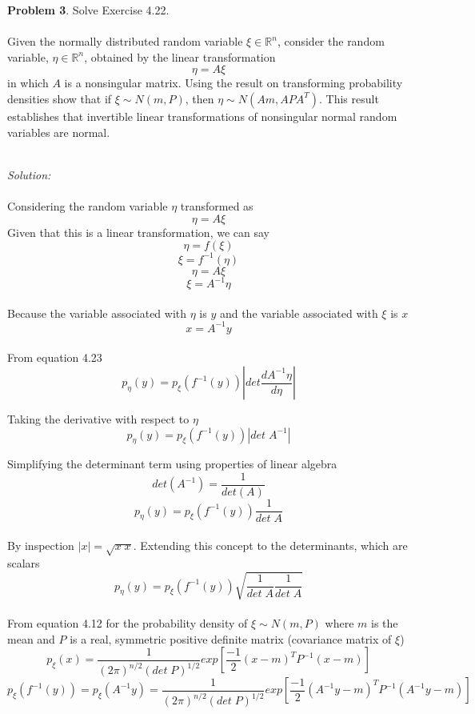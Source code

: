 \documentclass[10pt]{article}
\begin{document}


\newpage

\noindent\colorbox{mygray}{\begin{minipage}{\textwidth}
  {\bf Problem 3}.  Solve Exercise 4.22. \\ \\
  Given the normally distributed random variable $\xi\in{\mathbb R}^n$, consider the random variable, $\eta \in {\mathbb R}^n$, obtained by the linear transformation
\[ \eta = A\xi \]
in which $A$ is a nonsingular matrix. Using the result on transforming probability densities show that if $\xi \sim N(m,P)$, then $\eta \sim N(Am, APA^T)$. This result establishes that invertible linear transformations of nonsingular normal random variables are normal. 
\end{minipage}}
\\

{\em Solution:}  
\\
\\
Considering the random variable $\eta$ transformed as
\[ \eta=A \xi \]
Given that this is a linear transformation, we can say
\[ \eta=f(\xi) \]
\[ \xi=f^{-1}(\eta) \]
\[ \eta=A \xi \]
\[ \xi=A^{-1}\eta \]
\\

\noindent
Because the variable associated with $\eta$ is $y$ and the variable associated with $\xi$ is $x$
\[ x=A^{-1}y \]
\\

\noindent
From equation 4.23
\[ p_\eta(y)=p_\xi(f^{-1}(y))\left|det \frac{dA^{-1}\eta}{d \eta} \right| \]

\noindent
Taking the derivative with respect to $\eta$ 
\[ p_\eta(y)=p_\xi(f^{-1}(y))\left|det \; A^{-1}\right| \]

\noindent
Simplifying the determinant term using properties of linear algebra
\[ det(A^{-1})=\frac{1}{det(A)} \]
\[ p_\eta(y)=p_\xi(f^{-1}(y))\frac{1}{det\; A}\]
\\

\noindent
By inspection $|x|=\sqrt{x\;x}$. Extending this concept to the determinants, which are scalars
\[ p_\eta(y)=p_\xi(f^{-1}(y))\sqrt{\frac{1}{det\; A} \frac{1}{det\; A} } \]
\\

\noindent
From equation 4.12 for the probability density of $\xi \sim N(m,P)$ where $m$ is the mean and $P$ is a real, symmetric positive definite matrix (covariance matrix of $\xi$)
\[ p_{\xi}(x)=\frac{1}{(2\pi)^{n/2}(det\;P)^{1/2}}exp\left[ \frac{-1}{2}(x-m)^TP^{-1}(x-m) \right] \]
\[  p_{\xi}(f^{-1}(y)) = p_{\xi}(A^{-1}y) =\frac{1}{(2\pi)^{n/2}(det\;P)^{1/2}}exp\left[ \frac{-1}{2}(A^{-1}y-m)^TP^{-1}(A^{-1}y-m) \right] \]
\\
\end{document}
